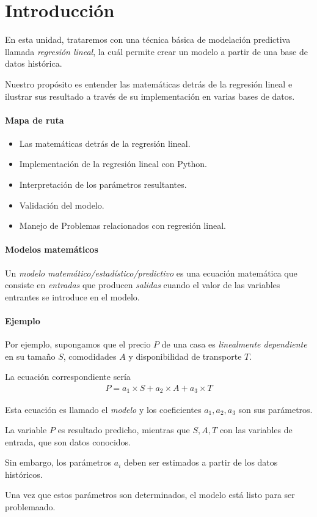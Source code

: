 \section{Introducción}

En esta unidad, trataremos con una técnica básica de modelación predictiva llamada \emph{regresión lineal}, la cuál permite crear un modelo a partir de una base de datos histórica.


Nuestro propósito es entender las matemáticas detrás de la regresión lineal e ilustrar sus resultado a través de su implementación en varias bases de datos.

\paragraph{Mapa de ruta}
\begin{itemize}
	\item Las matemáticas detrás de la regresión lineal.
	\item Implementación de la regresión lineal con Python.
	\item Interpretación de los parámetros resultantes.
	\item Validación del modelo.
	\item Manejo de Problemas relacionados con regresión lineal.
\end{itemize}


\paragraph{Modelos matemáticos}
Un \emph{modelo matemático/estadístico/predictivo} es una ecuación matemática que consiste en \emph{entradas} que producen \emph{salidas} cuando el valor de las variables entrantes se introduce en el modelo.

\paragraph{Ejemplo}
Por ejemplo, supongamos que el precio $P$ de una casa es \emph{linealmente dependiente} en su tamaño $S$, comodidades $A$ y disponibilidad de transporte $T$.



La ecuación correspondiente sería
\begin{align}
	P = a_{1}\times S+ a_{2} \times A + a_{3} \times T
\end{align}



Esta ecuación es llamado el \emph{modelo} y los coeficientes $a_{1},a_{2},a_{3}$ son sus parámetros.



La variable $P$ es resultado predicho, mientras que $S,A,T$ con las variables de entrada, que son datos conocidos.


Sin embargo, los parámetros $a_{i}$ deben ser estimados a partir de los datos históricos.


Una vez que estos parámetros son determinados, el modelo está listo para ser problemaado.

